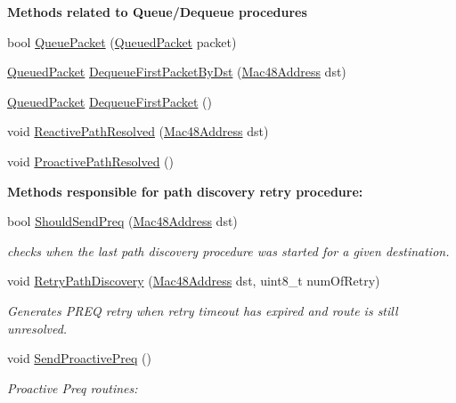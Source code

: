 \begin{Indent}{\bf Methods related to Queue/\+Dequeue procedures}\par
\begin{DoxyCompactItemize}
\item 
bool \hyperlink{classns3_1_1dot11s_1_1HwmpProtocol_a460a535ddc88fd28ef5ddc67f91823ce}{Queue\+Packet} (\hyperlink{structns3_1_1dot11s_1_1HwmpProtocol_1_1QueuedPacket}{Queued\+Packet} packet)
\item 
\hyperlink{structns3_1_1dot11s_1_1HwmpProtocol_1_1QueuedPacket}{Queued\+Packet} \hyperlink{classns3_1_1dot11s_1_1HwmpProtocol_a90618325ad9eb49c63093da0a9b313d9}{Dequeue\+First\+Packet\+By\+Dst} (\hyperlink{classns3_1_1Mac48Address}{Mac48\+Address} dst)
\item 
\hyperlink{structns3_1_1dot11s_1_1HwmpProtocol_1_1QueuedPacket}{Queued\+Packet} \hyperlink{classns3_1_1dot11s_1_1HwmpProtocol_a0e47fb414214051029105abc662db296}{Dequeue\+First\+Packet} ()
\item 
void \hyperlink{classns3_1_1dot11s_1_1HwmpProtocol_ac9ee2097883725cf40dd05537e12a9eb}{Reactive\+Path\+Resolved} (\hyperlink{classns3_1_1Mac48Address}{Mac48\+Address} dst)
\item 
void \hyperlink{classns3_1_1dot11s_1_1HwmpProtocol_ad6c9925336d3061cf5675cd459216883}{Proactive\+Path\+Resolved} ()
\end{DoxyCompactItemize}
\end{Indent}
\begin{Indent}{\bf Methods responsible for path discovery retry procedure\+:}\par
\begin{DoxyCompactItemize}
\item 
bool \hyperlink{classns3_1_1dot11s_1_1HwmpProtocol_a792bc8597a821a38777140867863c215}{Should\+Send\+Preq} (\hyperlink{classns3_1_1Mac48Address}{Mac48\+Address} dst)
\begin{DoxyCompactList}\small\item\em checks when the last path discovery procedure was started for a given destination. \end{DoxyCompactList}\item 
void \hyperlink{classns3_1_1dot11s_1_1HwmpProtocol_ab2d4bf81d76e1ad3767a1a01dd3c3523}{Retry\+Path\+Discovery} (\hyperlink{classns3_1_1Mac48Address}{Mac48\+Address} dst, uint8\+\_\+t num\+Of\+Retry)
\begin{DoxyCompactList}\small\item\em Generates P\+R\+EQ retry when retry timeout has expired and route is still unresolved. \end{DoxyCompactList}\item 
void \hyperlink{classns3_1_1dot11s_1_1HwmpProtocol_aa441183b0679939c73535bd256e8d0d0}{Send\+Proactive\+Preq} ()
\begin{DoxyCompactList}\small\item\em Proactive Preq routines\+: \end{DoxyCompactList}\end{DoxyCompactItemize}
\end{Indent}
